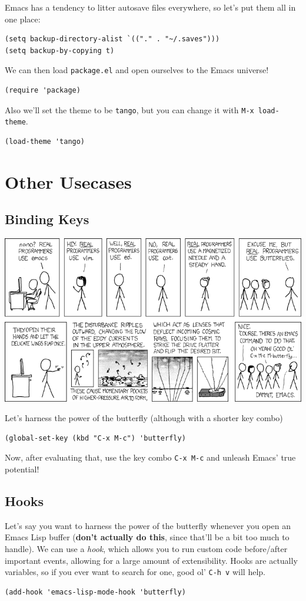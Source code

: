 \documentclass[letterpaper]{article}
\begin{document}
Emacs has a tendency to litter autosave files everywhere, so let's put them all in one place:
\begin{verbatim}
(setq backup-directory-alist `(("." . "~/.saves")))
(setq backup-by-copying t)
\end{verbatim}

We can then load \texttt{package.el} and open ourselves to the Emacs universe!
\begin{verbatim}
(require 'package)
\end{verbatim}

Also we'll set the theme to be \texttt{tango}, but you can change it with  \texttt{M-x load-theme}.
\begin{verbatim}
(load-theme 'tango)
\end{verbatim}


\section{Other Usecases}
\label{sec:org1beffdd}
\subsection{Binding Keys}
\label{sec:orgef0f049}
\begin{center}
\includegraphics[width=.9\linewidth]{2021-09-27_22-48-23_screenshot.png}
\end{center}

Let's harness the power of the butterfly (although with a shorter key combo)
\begin{verbatim}
(global-set-key (kbd "C-x M-c") 'butterfly)
\end{verbatim}
Now, after evaluating that, use the key combo \texttt{C-x M-c} and unleash Emacs' true potential! 
\subsection{Hooks}
\label{sec:org1d92f43}
Let's say you want to harness the power of the butterfly whenever you open an Emacs Lisp buffer (\textbf{don't actually do this}, since that'll be a bit too much to handle). We can use a \emph{hook}, which allows you to run custom code before/after important events, allowing for a large amount of extensibility. Hooks are actually variables, so if you ever want to search for one, good ol' \texttt{C-h v} will help.
\begin{verbatim}
(add-hook 'emacs-lisp-mode-hook 'butterfly)
\end{verbatim}
\end{document}
